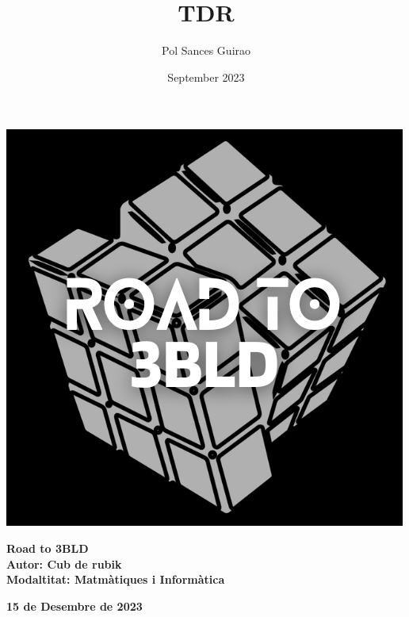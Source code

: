 \documentclass[11pt,oneside]{book}
\title{TDR}
\author{Pol Sances Guirao}
\date{September 2023}
\begin{document}
\frontmatter


\begin{titlepage}
    \centering
    \vspace*{\fill}
    
    \begin{minipage}{0.4\textwidth}
        \includegraphics[width=\textwidth]{img/logos/logo_TdR.png}
    \end{minipage}
    \hfill
    \begin{minipage}{0.5\textwidth}
        \begin{center}
            \textbf{\Huge Road to 3BLD}\\
            \vspace{0.5cm}
            \textbf{\large Autor: Cub de rubik}\\
            \vspace{0.5cm}
            \textbf{\large Modaltitat: Matmàtiques i Informàtica}
        \end{center}
    \end{minipage}

    \vfill
    \vspace*{\fill}
    \textbf{15 de Desembre de 2023}
\end{titlepage}



\newpage
\pagestyle{index}
\tableofcontents
\end{document}
